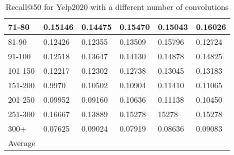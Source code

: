 \begin{table*}[]
\begin{tabular}{|l|l|l|l|l|l|}
    71-80     & 0.15146                    & 0.14475                    & 0.15470                    & 0.15043                    & 0.16026                   \\ \hline
    81-90     & 0.12426                    & 0.12355                    & 0.13509                    & 0.15796                    & 0.12724                    \\ \hline
    91-100    & 0.12518                    & 0.13647                    & 0.14130                    & 0.14878                    & 0.14825                    \\ \hline
    101-150   & 0.12217                    & 0.12302                    & 0.12738                    & 0.13045                    & 0.13183                    \\ \hline
    151-200   & 0.9970                     & 0.10502                    & 0.10904                    & 0.11410                    & 0.11065                    \\ \hline
    201-250   & 0.09952                    & 0.09160                    & 0.10636                    & 0.11138                    & 0.10450                    \\ \hline
    251-300   & 0.16667                    & 0.13889                    & 0.15278                    & 15278                      & 0.15278                    \\ \hline
    300+      & 0.07625                    & 0.09024                    & 0.07919                    & 0.08636                    & 0.09083                           \\ \hline
    Average &                            &                            &                            &                            &                                   \\ \hline
    \end{tabular}
    \caption{Recall@50 for Yelp2020 with a different number of convolutions}
    \label{tab:Yelp2020-recall-evaluation-mean}
\end{table*}

